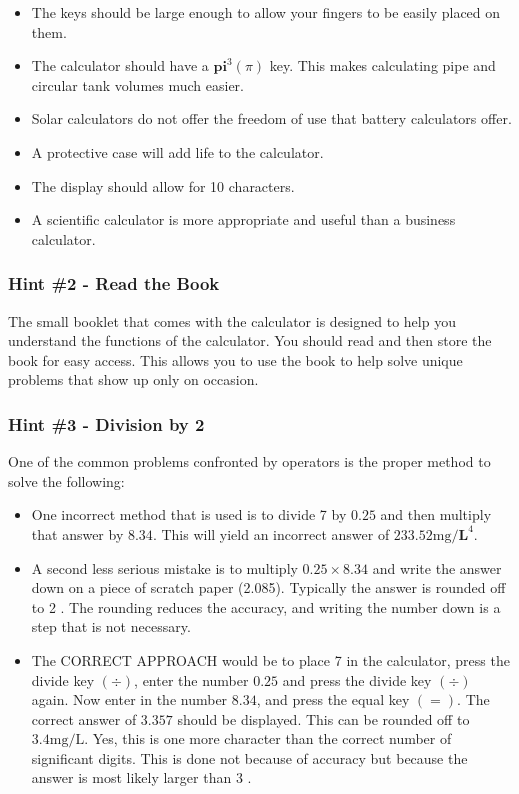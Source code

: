 \begin{itemize}
  \item The keys should be large enough to allow your fingers to be easily placed on them.

  \item The calculator should have a $\mathbf{p i}^{3}(\pi)$ key. This makes calculating pipe and circular tank volumes much easier.

  \item Solar calculators do not offer the freedom of use that battery calculators offer.

  \item A protective case will add life to the calculator.

  \item The display should allow for 10 characters.

  \item A scientific calculator is more appropriate and useful than a business calculator.

\end{itemize}
\subsubsection{Hint \#2 - Read the Book}
The small booklet that comes with the calculator is designed to help you understand the functions of the calculator. You should read and then store the book for easy access. This allows you to use the book to help solve unique problems that show up only on occasion.

\subsubsection{Hint \#3 - Division by 2}
One of the common problems confronted by operators is the proper method to solve the following:

\begin{itemize}
  \item One incorrect method that is used is to divide 7 by $0.25$ and then multiply that answer by $8.34$. This will yield an incorrect answer of $233.52 \mathrm{mg} / \mathbf{L}^{4}$.

  \item A second less serious mistake is to multiply $0.25 \times 8.34$ and write the answer down on a piece of scratch paper (2.085). Typically the answer is rounded off to 2 . The rounding reduces the accuracy, and writing the number down is a step that is not necessary.

  \item The CORRECT APPROACH would be to place 7 in the calculator, press the divide key $(\div)$, enter the number $0.25$ and press the divide key $(\div)$ again. Now enter in the number $8.34$, and press the equal key $(=)$. The correct answer of $3.357$ should be displayed. This can be rounded off to $3.4 \mathrm{mg} / \mathrm{L}$. Yes, this is one more character than the correct number of significant digits. This is done not because of accuracy but because the answer is most likely larger than 3 .

\end{itemize}
